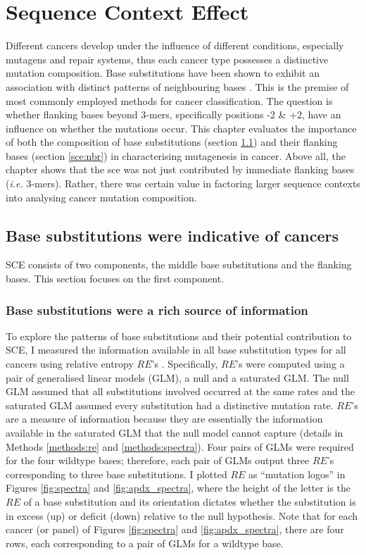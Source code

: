 \chapter{Sequence Context Effect}\label{sce}

Different cancers develop under the influence of different conditions, especially mutagens and repair systems, thus each cancer type possesses a distinctive mutation composition. Base substitutions have been shown to exhibit an association with distinct patterns of neighbouring bases \citep{Zhu2017,Zhu2020,Vinson2012CGMethylation}. This is the premise of most commonly employed methods for cancer classification. The question is whether flanking bases beyond 3-mers, specifically positions -2 \& +2, have an influence on whether the mutations occur. This chapter evaluates the importance of both the composition of base substitutions (section \ref{sce:spectra}) and their flanking bases (section \ref{sce:nbr}) in characterising mutagenesis in cancer. Above all, the chapter shows that the \gls{sce} was not just contributed by immediate flanking bases (\textit{i.e.} 3-mers). Rather, there was certain value in factoring larger sequence contexts into analysing cancer mutation composition.

\section{Base substitutions were indicative of cancers}\label{sce:spectra}
SCE consists of two components, the middle base substitutions and the flanking bases. This section focuses on the first component.

\subsection{Base substitutions were a rich source of information}
To explore the patterns of base substitutions and their potential contribution to SCE, I measured the information available in all base substitution types for all cancers using relative entropy $RE$'s \citep{Zhu2017}. Specifically, $RE$'s were computed using a pair of generalised linear models (GLM), a null and a saturated GLM. The null GLM assumed that all substitutions involved occurred at the same rates and the saturated GLM assumed every substitution had a distinctive mutation rate. $RE$'s are a measure of information because they are essentially the information available in the saturated GLM that the null model cannot capture (details in Methods \ref{methods:re} and \ref{methods:spectra}). Four pairs of GLMs were required for the four wildtype bases; therefore, each pair of GLMs output three $RE$'s corresponding to three base substitutions. I plotted $RE$ as ``mutation logos'' in Figures \ref{fig:spectra} and \ref{fig:apdx_spectra}, where the height of the letter is the $RE$ of a base substitution and its orientation dictates whether the substitution is in excess (up) or deficit (down) relative to the null hypothesis. Note that for each cancer (or panel) of Figures \ref{fig:spectra} and \ref{fig:apdx_spectra}, there are four rows, each corresponding to a pair of GLMs for a wildtype base. 

